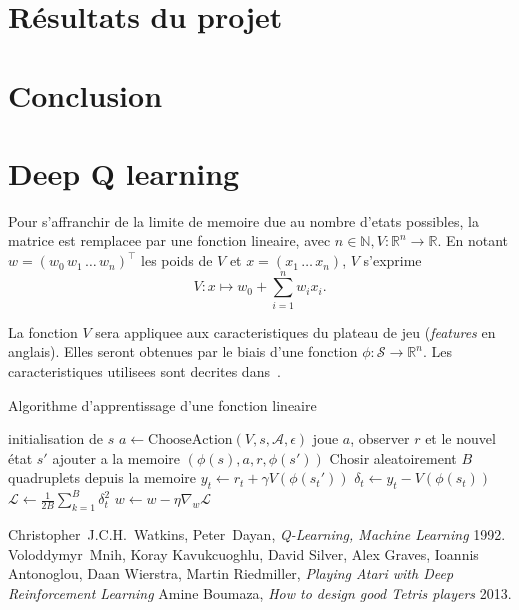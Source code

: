 \documentclass{article}
\newcommand{\R}{\mathbb{R}}
\begin{document}
\section{R\'esultats du projet}

\section*{Conclusion}

\appendix
\section{Deep Q learning}

Pour s'affranchir de la limite de memoire due au nombre d'etats possibles, la
matrice est remplacee par une fonction lineaire, avec \(n \in \mathbb{N}, V
\colon \R^n \to \R\). En notant \(w = (w_0\, w_1\, \dots\, w_n)^\top\) les poids
de \(V\) et \(x = (x_1\, \dots\, x_n)\), \(V\) s'exprime
\[
  V \colon x \mapsto w_0 + \sum_{i=1}^n w_i x_i.
\]

La fonction \(V\) sera appliquee aux caracteristiques du plateau de jeu
(\textit{features} en anglais). Elles seront obtenues par le biais d'une
fonction \(\phi\colon \mathcal{S} \to \R^n\). Les caracteristiques utilisees
sont decrites dans~\cite{boumaza13}.
\begin{algorithm}
  \caption{Algorithme d'apprentissage d'une fonction lineaire}\label{alg:linfct}
  \begin{algorithmic}
    [1]
    \Repeat{}
    \State{} initialisation de \(s\)
    \Repeat{}
    \State{} \(a \gets \mathup{ChooseAction}(V, s, \mathcal{A}, \epsilon)\)
    \State{} joue \(a\), observer \(r\) et le nouvel \'etat \(s'\)
    \State{} ajouter a la memoire \( \left(\phi(s), a, r, \phi(s')\right) \)
    \EndFor{}
    \State{} Chosir aleatoirement \(B\) quadruplets depuis la memoire
    \State{} \(y_t \gets r_t + \gamma V\left(\phi(s_t')\right)\)
    \State{} \(\delta_t \gets y_t - V \left(\phi(s_t)\right)\)
    \State{} \(\mathcal{L} \gets \frac{1}{2B}\sum_{k=1}^B \delta_t^2\)
    \State{} \(w \gets w - \eta \nabla_w \mathcal{L}\)
    \EndProcedure{}
  \end{algorithmic}
\end{algorithm}

\begin{thebibliography}{9}
    Christopher~J.C.H.~Watkins, Peter~Dayan,
    \textit{Q-Learning, Machine Learning}
    1992.
    Voloddymyr~Mnih, Koray Kavukcuoghlu, David Silver, Alex Graves, Ioannis
    Antonoglou, Daan Wierstra, Martin Riedmiller,
    \textit{Playing Atari with Deep Reinforcement Learning}
    Amine Boumaza,
    \textit{How to design good Tetris players}
    2013.
\end{thebibliography}
\end{document}
